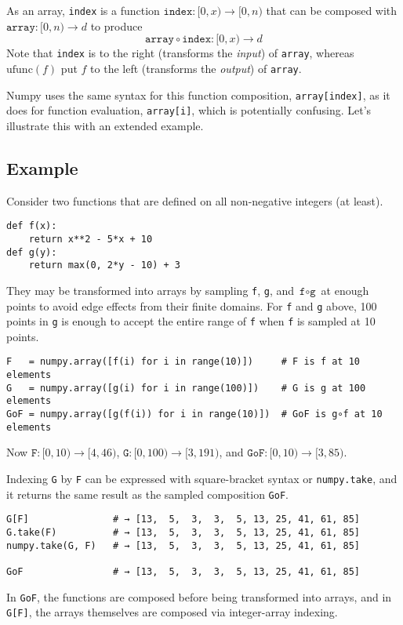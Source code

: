 \documentclass[12pt]{article}
\begin{document}
As an array, \texttt{index} is a function $\texttt{index}: [0, x) \to [0, n)$ that can be composed with $\texttt{array}: [0, n) \to d$ to produce
\[ \texttt{array} \circ \texttt{index}: [0, x) \to d \]
\noindent Note that \texttt{index} is to the right (transforms the {\it input}) of \texttt{array}, whereas $\mbox{ufunc}(f)$ put $f$ to the left (transforms the {\it output}) of \texttt{array}.

Numpy uses the same syntax for this function composition, \texttt{array[index]}, as it does for function evaluation, \texttt{array[i]}, which is potentially confusing. Let's illustrate this with an extended example.

\subsection*{Example}

Consider two functions that are defined on all non-negative integers (at least).
\begin{verbatim}
def f(x):
    return x**2 - 5*x + 10
def g(y):
    return max(0, 2*y - 10) + 3
\end{verbatim}

They may be transformed into arrays by sampling \texttt{f}, \texttt{g}, and $\texttt{f} \circ \texttt{g}$ at enough points to avoid edge effects from their finite domains. For \texttt{f} and \texttt{g} above, 100 points in \texttt{g} is enough to accept the entire range of \texttt{f} when \texttt{f} is sampled at 10 points.
\begin{verbatim}
F   = numpy.array([f(i) for i in range(10)])     # F is f at 10 elements
G   = numpy.array([g(i) for i in range(100)])    # G is g at 100 elements
GoF = numpy.array([g(f(i)) for i in range(10)])  # GoF is g∘f at 10 elements
\end{verbatim}
\noindent Now $\texttt{F}: [0, 10) \to [4, 46)$, $\texttt{G}: [0, 100) \to [3, 191)$, and $\texttt{GoF}: [0, 10) \to [3, 85)$.

Indexing \texttt{G} by \texttt{F} can be expressed with square-bracket syntax or \texttt{numpy.take}, and it returns the same result as the sampled composition \texttt{GoF}.
\begin{verbatim}
G[F]               # → [13,  5,  3,  3,  5, 13, 25, 41, 61, 85]
G.take(F)          # → [13,  5,  3,  3,  5, 13, 25, 41, 61, 85]
numpy.take(G, F)   # → [13,  5,  3,  3,  5, 13, 25, 41, 61, 85]

GoF                # → [13,  5,  3,  3,  5, 13, 25, 41, 61, 85]
\end{verbatim}
\noindent In \texttt{GoF}, the functions are composed before being transformed into arrays, and in \texttt{G[F]}, the arrays themselves are composed via integer-array indexing.
\end{document}
